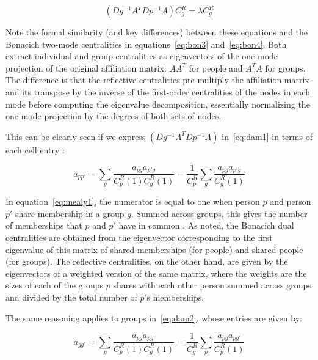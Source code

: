 \documentclass[a4paper,fleqn]{cas-sc}
\begin{document}
\begin{equation}
    \left(Dg^{-1}A^TDp^{-1}A\right)C^R_g = \lambda C^R_g
    \label{eq:dam2}
\end{equation}

Note the formal similarity (and key differences) between these equations and the Bonacich two-mode centralities in equations~\ref{eq:bon3} and~\ref{eq:bon4}. Both extract individual and group centralities as eigenvectors of the one-mode projection of the original affiliation matrix: $AA^T$ for people and $A^TA$ for groups. The difference is that the reflective centralities pre-multiply the affiliation matrix and its transpose by the inverse of the first-order centralities of the nodes in each mode before computing the eigenvalue decomposition, essentially normalizing the one-mode projection by the degrees of both sets of nodes. 

This can be clearly seen if we express $\left(Dg^{-1}A^TDp^{-1}A\right)$ in~\ref{eq:dam1} in terms of each cell entry \cite[eq. 4]{mealy2019interpreting}:

\begin{equation}
    a_{pp'} = \sum_g\frac{a_{pg}a_{p'g}}{C^R_p(1)C^R_g(1)} = 
    \frac{1}{C^R_p}\sum_g\frac{a_{pg}a_{p'g}}{C^R_g(1)}
    \label{eq:mealy1}
\end{equation}

In equation~\ref{eq:mealy1}, the numerator is equal to one when person $p$ and person $p'$ share membership in a group $g$. Summed across groups, this gives the number of memberships that $p$ and $p'$ have in common \citep{breiger1974duality}. As noted, the Bonacich dual centralities are obtained from the eigenvector corresponding to the first eigenvalue of this matrix of shared memberships (for people) and shared people (for groups). The reflective centralities, on the other hand, are given by the eigenvectors of a weighted version of the same matrix, where the weights are the sizes of each of the groups $p$ shares with each other person summed across groups and divided by the total number of $p$'s memberships. 

The same reasoning applies to groups in~\ref{eq:dam2}, whose entries are given by:

\begin{equation}
    a_{gg'} = \sum_p\frac{a_{pg}a_{pg'}}{C^R_p(1)C^R_g(1)} = 
    \frac{1}{C^R_g}\sum_p\frac{a_{pg}a_{pg'}}{C^R_p(1)}
    \label{eq:mealy2}
\end{equation}
\end{document}
